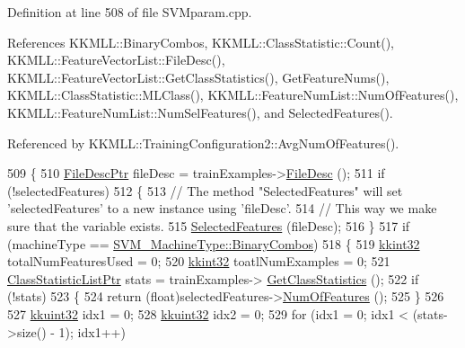Definition at line 508 of file S\+V\+Mparam.\+cpp.



References K\+K\+M\+L\+L\+::\+Binary\+Combos, K\+K\+M\+L\+L\+::\+Class\+Statistic\+::\+Count(), K\+K\+M\+L\+L\+::\+Feature\+Vector\+List\+::\+File\+Desc(), K\+K\+M\+L\+L\+::\+Feature\+Vector\+List\+::\+Get\+Class\+Statistics(), Get\+Feature\+Nums(), K\+K\+M\+L\+L\+::\+Class\+Statistic\+::\+M\+L\+Class(), K\+K\+M\+L\+L\+::\+Feature\+Num\+List\+::\+Num\+Of\+Features(), K\+K\+M\+L\+L\+::\+Feature\+Num\+List\+::\+Num\+Sel\+Features(), and Selected\+Features().



Referenced by K\+K\+M\+L\+L\+::\+Training\+Configuration2\+::\+Avg\+Num\+Of\+Features().


\begin{DoxyCode}
509 \{
510   \hyperlink{class_k_k_m_l_l_1_1_file_desc}{FileDescPtr}  fileDesc = trainExamples->\hyperlink{class_k_k_m_l_l_1_1_feature_vector_list_a736923be9c4ac7553a5aa87dd24efd16}{FileDesc} ();
511   \textcolor{keywordflow}{if}  (!selectedFeatures)
512   \{
513     \textcolor{comment}{// The method "SelectedFeatures" will set 'selectedFeatures' to a new instance using 'fileDesc'.}
514     \textcolor{comment}{// This way we make sure that the variable exists.}
515     \hyperlink{class_k_k_m_l_l_1_1_s_v_mparam_a52c95a964ff1638bb24289967937b29b}{SelectedFeatures} (fileDesc);
516   \}
517   \textcolor{keywordflow}{if}  (machineType == \hyperlink{namespace_k_k_m_l_l_ad917464bc631109a3021cf02cd27af9aa01ad67463554c5f5552dcc6b5f4a553f}{SVM\_MachineType::BinaryCombos})
518   \{
519     \hyperlink{namespace_k_k_b_a8fa4952cc84fda1de4bec1fbdd8d5b1b}{kkint32} totalNumFeaturesUsed = 0;
520     \hyperlink{namespace_k_k_b_a8fa4952cc84fda1de4bec1fbdd8d5b1b}{kkint32} toatlNumExamples     = 0;
521     \hyperlink{class_k_k_m_l_l_1_1_class_statistic_list}{ClassStatisticListPtr}  stats = trainExamples->
      \hyperlink{class_k_k_m_l_l_1_1_feature_vector_list_a25d68202689dd6400dcf9a3b18fd5ad9}{GetClassStatistics} ();
522     \textcolor{keywordflow}{if}  (!stats)
523     \{
524       \textcolor{keywordflow}{return} (\textcolor{keywordtype}{float})selectedFeatures->\hyperlink{class_k_k_m_l_l_1_1_feature_num_list_af2d974ca245a5d3c2bc88da0fe674493}{NumOfFeatures} ();
525     \}
526 
527     \hyperlink{namespace_k_k_b_af8d832f05c54994a1cce25bd5743e19a}{kkuint32}  idx1 = 0;
528     \hyperlink{namespace_k_k_b_af8d832f05c54994a1cce25bd5743e19a}{kkuint32}  idx2 = 0;
529     \textcolor{keywordflow}{for}  (idx1 = 0;  idx1 < (stats->size() - 1);  idx1++)

\end{DoxyCode}
